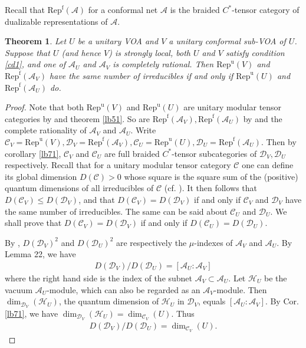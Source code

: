 \documentclass[11pt,b5paper,notitlepage]{article}
\theoremstyle{definition}
\theoremstyle{plain}
\newtheorem{thm}[df]{Theorem}
\newcommand{\mc}{\mathcal}
\newcommand{\Repu}{\mathrm{Rep}^{\mathrm u}}
\newcommand{\Repf}{\mathrm{Rep}^{\mathrm f}}
\newcommand{\RepuV}{\mathrm{Rep}^{\mathrm u}(V)}
\numberwithin{equation}{subsection}
\begin{document}
Recall that $\Repf(\mc A)$ for a conformal net $\mc A$ is the braided $C^*$-tensor category of dualizable representations of $\mc A$.

\begin{thm}\label{lb85}
	Let $U$ be a unitary VOA and $V$ a unitary conformal sub-VOA of $U$. Suppose that $U$ (and hence $V$) is strongly local,  both $U$ and $V$ satisfy condition \ref{cd1}, and one of $\mc A_U$ and $\mc A_V$ is completely rational. Then $\RepuV$ and $\Repf(\mc A_V)$ have the same number of irreducibles if and only if $\Repu(U)$ and $\Repf(\mc A_U)$ do.
\end{thm}


\begin{proof}
	Note that both $\Repu(V)$ and $\Repu(U)$ are unitary modular tensor categories by \cite{Hua08b} and theorem \ref{lb51}. So are $\Repf(\mc A_V),\Repf(\mc A_U)$ by \cite{KLM01} and the complete rationality of $\mc A_V$ and $\mc A_U$. Write $\mc C_V=\Repu(V),\mc D_V=\Repf(\mc A_V),\mc C_U=\Repu(U),\mc D_U=\Repf(\mc A_U)$. Then by corollary \ref{lb71}, $\mc C_V$ and $\mc C_U$ are full braided $C^*$-tensor subcategories of $\mc D_V,\mc D_U$ respectively. Recall that for a unitary modular tensor category $\mc C$ one can define its global dimension $D(\mc C)>0$ whose square is the square sum of the (positive) quantum dimensions of all irreducibles of $\mc C$ (cf. \cite[(3.1.22)]{BK01}). It then follows that $D(\mc C_V)\leq D(\mc D_V)$, and that $D(\mc C_V)=D(\mc D_V)$ if and only if $\mc C_V$ and $\mc D_V$ have the same number of irreducibles. The same can be said about $\mc C_U$ and $\mc D_U$. We shall prove that $D(\mc C_V)=D(\mc D_V)$ if and only if $D(\mc C_U)=D(\mc D_U)$.
	
	By \cite{KLM01}, $D(\mc D_V)^2$ and $D(\mc D_U)^2$ are respectively the $\mu$-indexes of $\mc A_V$ and $\mc A_U$. By \cite{Lon03} Lemma 22, we have
	\begin{align*}
	D(\mc D_V)/D(\mc D_U)=[\mc A_U:\mc A_V]
	\end{align*} 
	where the right hand side is the index of the subnet $\mc A_V\subset\mc A_U$. Let $\mc H_U$ be the vacuum $\mc A_U$-module, which can also be regarded as an $\mc A_V$-module. Then $\dim_{\mc D_V}(\mc H_U)$, the quantum dimension  of $\mc H_U$  in $\mc D_V$, equals $[\mc A_U:\mc A_V]$. By Cor. \ref{lb71}, we have $\dim_{\mc D_V}(\mc H_U)=\dim_{\mc C_V}(U)$. Thus
	\begin{align*}
	D(\mc D_V)/D(\mc D_U)=\dim_{\mc C_V}(U).
	\end{align*}
	

\end{proof}
\end{document}

